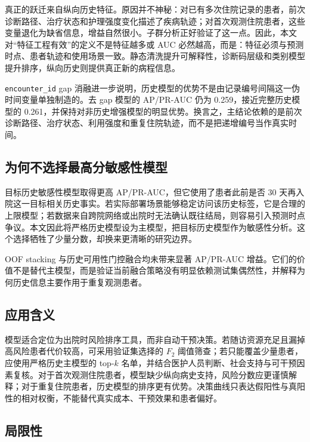 \documentclass[UTF8,a4paper,11pt,fontset=none]{ctexart}
\begin{document}
真正的跃迁来自纵向历史特征。原因并不神秘：对已有多次住院记录的患者，前次诊断路径、治疗状态和护理强度变化描述了疾病轨迹；对首次观测住院患者，这些变量退化为缺省信息，增益自然很小。子群分析正好验证了这一点。因此，本文对“特征工程有效”的定义不是特征越多或 AUC 必然越高，而是：特征必须与预测时点、患者轨迹和使用场景一致。静态清洗提升可解释性，诊断码层级和类别模型提升排序，纵向历史则提供真正新的病程信息。

\texttt{encounter\_id} gap 消融进一步说明，历史模型的优势不是由记录编号间隔这一伪时间变量单独制造的。去 gap 模型的 AP/PR-AUC 仍为 0.259，接近完整历史模型的 0.261，并保持对非历史增强模型的明显优势。换言之，主结论依赖的是前次诊断路径、治疗状态、利用强度和重复住院轨迹，而不是把递增编号当作真实时间。

\subsection{为何不选择最高分敏感性模型}

目标历史敏感性模型取得更高 AP/PR-AUC，但它使用了患者此前是否 30 天再入院这一目标相关历史事实。若实际部署场景能够稳定访问该历史标签，它是合理的上限模型；若数据来自跨院网络或出院时无法确认既往结局，则容易引入预测时点争议。本文因此将严格历史模型设为主模型，把目标历史模型作为敏感性分析。这个选择牺牲了少量分数，却换来更清晰的研究边界。

OOF stacking 与历史可用性门控融合均未带来显著 AP/PR-AUC 增益。它们的价值不是替代主模型，而是验证当前融合策略没有明显依赖测试集偶然性，并解释为何历史信息主要作用于重复观测患者。

\subsection{应用含义}

模型适合定位为出院时风险排序工具，而非自动干预决策。若随访资源充足且漏掉高风险患者代价较高，可采用验证集选择的 $F_2$ 阈值筛查；若只能覆盖少量患者，应使用严格历史主模型的 top-$k$ 名单，并结合医护人员判断、社会支持与可干预因素复核。对于首次观测住院患者，模型缺少纵向病史支持，风险分数应更谨慎解释；对于重复住院患者，历史模型的排序更有优势。决策曲线只表达假阳性与真阳性的相对权衡，不能替代真实成本、干预效果和患者偏好。

\subsection{局限性}
\end{document}
